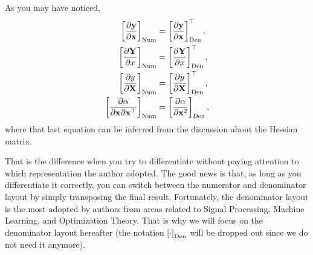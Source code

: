 As you may have noticed,
\begin{align}
    \left[ \dfrac{\partial \mathbf{y}}{\partial \mathbf{x}} \right]_{\textnormal{Num}} & = \left[ \dfrac{\partial \mathbf{y}}{\partial \mathbf{x}} \right]_{\textnormal{Den}}^{\top}, \\
    \left[ \dfrac{\partial \mathbf{Y}}{\partial x}\right]_{\textnormal{Num}} & = \left[ \dfrac{\partial \mathbf{Y}}{\partial x}\right]_{\textnormal{Den}}^{\top}, \\
    \left[\dfrac{\partial y}{\partial \mathbf{X}}\right]_{\textnormal{Num}} & = \left[\dfrac{\partial y}{\partial \mathbf{X}}\right]_{\textnormal{Den}}^{\top}, \\
    \left[\dfrac{\partial \alpha}{\partial \mathbf{x} \partial\mathbf{x}^\top}\right]_{\textnormal{Num}} & = \left[\dfrac{\partial \alpha}{\partial \mathbf{x}^{2}}\right]_{\textnormal{Den}},
\end{align}
where that last equation can be inferred from the discussion about the Hessian matrix.

That is the difference when you try to differentiate without paying attention to which representation the author adopted. The good news is that, as long as you differentiate it correctly, you can switch between the numerator and denominator layout by simply transposing the final result. Fortunately, the denominator layout is the most adopted by authors from areas related to Signal Processing, Machine Learning, and Optimization Theory. That is why we will focus on the denominator layout hereafter (the notation \(\left[\cdot\right]_{\textnormal{Den}}\) will be dropped out since we do not need it anymore). %

